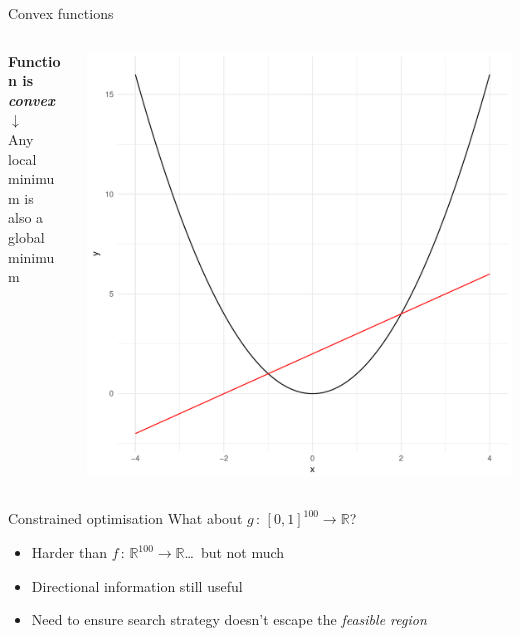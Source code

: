 \documentclass[16pt,aspectratio=169]{beamer}
\newcommand{\R}{\ensuremath{\mathbb{R}}}
\begin{document}
\begin{frame}{Convex functions}
    \begin{columns}
        \begin{column}{0.5\textwidth}
            \centering
            \textbf{Function is \emph{convex}} \\[1em]
            $\downarrow$ \\[1em]
            Any local minimum is \\ also a global minimum
        \end{column}
        \begin{column}{0.5\textwidth}
            \includegraphics[height=0.95\textheight]{figures/convex_function}
        \end{column}
    \end{columns}
\end{frame}

\begin{frame}{Constrained optimisation}
    What about $g\,:\,[0, 1]^{100} \to \R$?
    \begin{itemize}
        \item Harder than $f\,:\,\R^{100} \to \R$\ldots~but not much
        \item Directional information still useful
        \item Need to ensure search strategy doesn't escape the
              \emph{feasible region}
    \end{itemize}
\end{frame}
\end{document}

